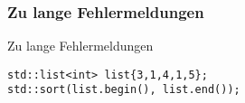 \subsubsection{Zu lange Fehlermeldungen}

\begin{frame}[fragile]{Zu lange Fehlermeldungen}

    \begin{center}
        \begin{tcolorbox}
            \begin{verbatim}
std::list<int> list{3,1,4,1,5};
std::sort(list.begin(), list.end());
\end{verbatim}
        \end{tcolorbox}
    \end{center}
\end{frame}

